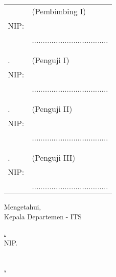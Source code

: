 \noindent
\begin{tabularx}{\textwidth}{X l}
  \advisor{}               & (Pembimbing I)                      \\
  NIP: \advisornip{}       &                                     \\
                           & ................................... \\
                           &                                     \\
                           &                                     \\
  \examinerone{}.          & (Penguji I)                         \\
  NIP: \examineronenip{}   &                                     \\
                           & ................................... \\
                           &                                     \\
                           &                                     \\
  \examinertwo{}.          & (Penguji II)                        \\
  NIP: \examinertwonip{}   &                                     \\
                           & ................................... \\
                           &                                     \\
                           &                                     \\
  \examinerthree{}.        & (Penguji III)                       \\
  NIP: \examinerthreenip{} &                                     \\
                           & ................................... \\
\end{tabularx}
\endgroup

\begin{center}
  Mengetahui, \\
  Kepala Departemen \department{} \facultyshort{} - ITS\\

  \vspace{8ex}

  \underline{\headofdepartment{}.} \\
  NIP. \headofdepartmentnip{}
\end{center}

\begin{center}
  \textbf{\MakeUppercase{\place{}}\\\MONTH{}, \the\year{}}
\end{center}
\endgroup

